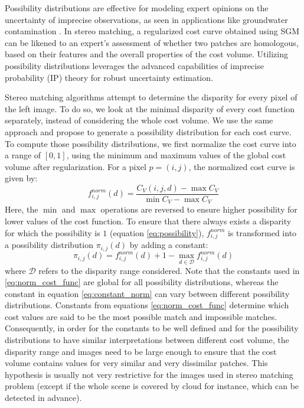 Possibility distributions are effective for modeling expert opinions on the uncertainty of imprecise observations, as seen in applications like groundwater contamination \cite{bardossy_l-_1995, baudrit_joint_2007}. In stereo matching, a regularized cost curve obtained using SGM can be likened to an expert's assessment of whether two patches are homologous, based on their features and the overall properties of the cost volume. Utilizing possibility distributions leverages the advanced capabilities of imprecise probability (IP) theory for robust uncertainty estimation.

Stereo matching algorithms attempt to determine the disparity for every pixel of the left image. To do so, we look at the minimal disparity of every cost function separately, instead of considering the whole cost volume. We use the same approach and propose to generate a possibility distribution for each cost curve. To compute those possibility distributions, we first normalize the cost curve into a range of \([0,1]\), using the minimum and maximum values of the global cost volume after regularization. For a pixel \( p = (i, j) \), the normalized cost curve is given by:
\begin{equation}
    f_{i,j}^{norm}(d) = \frac{C_V(i,j,d) - \max C_V}{\min C_V - \max C_V} \label{eq:norm_cost_func}
\end{equation}
Here, the \(\min\) and \(\max\) operations are reversed to ensure higher possibility for lower values of the cost function. To ensure that there always exists a disparity for which the possibility is $1$ (equation \ref{eq:possibility}), \( f_{i,j}^{norm} \) is transformed into a possibility distribution \( \pi_{i,j}(d) \) by adding a constant:
\begin{equation}
    \pi_{i,j}(d) = f_{i,j}^{norm}(d) + 1 - \max_{d \in \mathcal{D}} f_{i,j}^{norm}(d) \label{eq:constant_norm}
\end{equation}
where \(\mathcal{D}\) refers to the disparity range considered. Note that the constants used in \ref{eq:norm_cost_func} are global for all possibility distributions, whereas the constant in equation \ref{eq:constant_norm} can vary between different possibility distributions. Constants from equations \ref{eq:norm_cost_func} determine which cost values are said to be the most possible match and impossible matches. Consequently, in order for the constants to be well defined and for the possibility distributions to have similar interpretations between different cost volume, the disparity range and images need to be large enough to ensure that the cost volume contains values for very similar and very dissimilar patches. This hypothesis is usually not very restrictive for the images used in stereo matching problem (except if the whole scene is covered by cloud for instance, which can be detected in advance).

